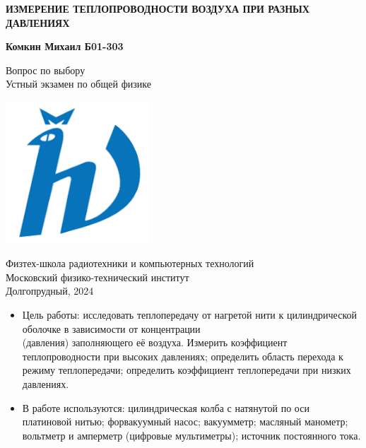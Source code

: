 \documentclass[12pt]{article}
\begin{document}
    \begin{titlepage}
        \begin{center}
            \vspace*{1cm}

            \Huge
            \textbf{ИЗМЕРЕНИЕ ТЕПЛОПРОВОДНОСТИ ВОЗДУХА ПРИ РАЗНЫХ ДАВЛЕНИЯХ}

            \vspace{1.5cm}

            \Large
            \textbf{Комкин Михаил Б01-303}

            \vfill

            Вопрос по выбору \\
            Устный экзамен по общей физике

            \vspace{0.8cm}

            \includegraphics[width=0.4\textwidth]{university_logo.png}

            Физтех-школа радиотехники и компьютерных технологий\\
            Московский физико-технический институт\\
            Долгопрудный, 2024
        \end{center}
    \end{titlepage}
    
    \begin{itemize}
        \item{Цель работы:} исследовать теплопередачу от нагретой нити к цилиндрической оболочке в зависимости от концентрации\\ 
        (давления) заполняющего её воздуха. Измерить коэффициент теплопроводности при высоких давлениях; определить область перехода к 
        режиму теплопередачи; определить коэффициент теплопередачи при низких давлениях.\\
        \item{В работе используются:} цилиндрическая колба с натянутой по оси платиновой нитью; форвакуумный насос; вакуумметр; масляный манометр; вольтметр и амперметр
        (цифровые мультиметры); источник постоянного тока.
    \end{itemize}
\end{document}
